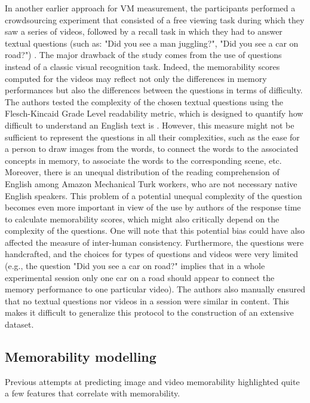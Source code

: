 \documentclass[sigconf]{acmart}
\begin{document}
In another earlier approach for VM measurement, the participants performed a crowdsourcing experiment that consisted of a free viewing task during which they saw a series of videos, followed by a recall task in which they had to answer textual questions (such as: "Did you see a man juggling?", "Did you see a car on road?") \cite{shekhar_2017_show}.
The major drawback of the study comes from the use of questions instead of a classic visual recognition task.
Indeed, the memorability scores computed for the videos may reflect not only the differences in memory performances but also the differences between the questions in terms of difficulty.
The authors tested the complexity of the chosen textual questions using the Flesch-Kincaid Grade Level readability metric, which is designed to quantify how difficult to understand an English text is \cite{kincaid_1975_derivation}.
However, this measure might not be sufficient to represent the questions in all their complexities, such as the ease for a person to draw images from the words, to connect the words to the associated concepts in memory, to associate the words to the corresponding scene, etc.
Moreover, there is an unequal distribution of the reading comprehension of English among Amazon Mechanical Turk workers, who are not necessary native English speakers.
This problem of a potential unequal complexity of the question becomes even more important in view of the use by authors of the response time to calculate memorability scores, which might also critically depend on the complexity of the questions.
One will note that this potential bias could have also affected the measure of inter-human consistency.
Furthermore, the questions were handcrafted, and the choices for types of questions and videos were very limited (e.g., the question "Did you see a car on road?" implies that in a whole experimental session only one car on a road should appear to connect the memory performance to one particular video).
The authors also manually ensured that no textual questions nor videos in a session were similar in content.
This makes it difficult to generalize this protocol to the construction of an extensive dataset.

\subsection{Memorability modelling}
Previous attempts at predicting image and video memorability highlighted quite a few features that correlate with memorability.
\end{document}
